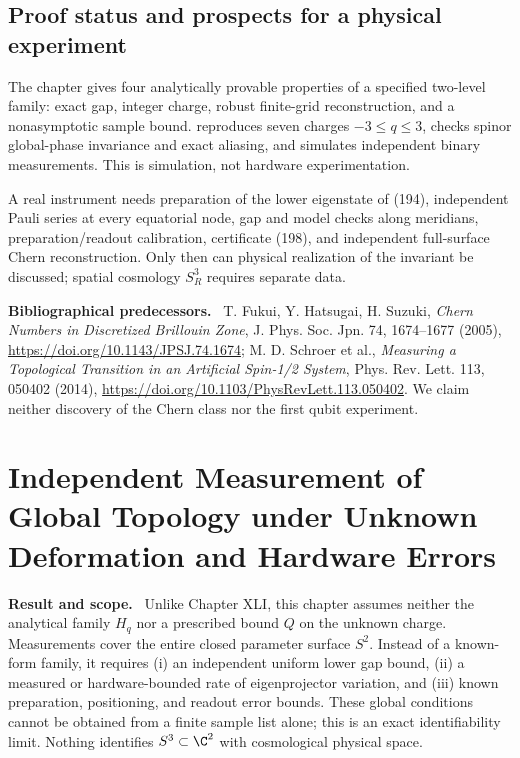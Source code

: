 \documentclass[11pt,a4paper,oneside]{book}
\newcommand{\note}[1]{\par\medskip\noindent\textbf{#1}\ }
\begin{document}
\section{Proof status and prospects for a physical experiment}
The chapter gives four analytically provable properties of a specified two-level family: exact gap, integer charge, robust finite-grid reconstruction, and a nonasymptotic sample bound.  reproduces seven charges $-3\le q\le3$, checks spinor global-phase invariance and exact aliasing, and simulates independent binary measurements. This is simulation, not hardware experimentation.

A real instrument needs preparation of the lower eigenstate of (194), independent Pauli series at every equatorial node, gap and model checks along meridians, preparation/readout calibration, certificate (198), and independent full-surface Chern reconstruction. Only then can physical realization of the invariant be discussed; spatial cosmology $S_R^3$ requires separate data.
\note{Bibliographical predecessors.} T. Fukui, Y. Hatsugai, H. Suzuki, \emph{Chern Numbers in Discretized Brillouin Zone}, J. Phys. Soc. Jpn. 74, 1674--1677 (2005), \url{https://doi.org/10.1143/JPSJ.74.1674}; M. D. Schroer et al., \emph{Measuring a Topological Transition in an Artificial Spin-1/2 System}, Phys. Rev. Lett. 113, 050402 (2014), \url{https://doi.org/10.1103/PhysRevLett.113.050402}. We claim neither discovery of the Chern class nor the first qubit experiment.
\setcounter{equation}{199}


\chapter{Independent Measurement of Global Topology under Unknown Deformation and Hardware Errors}
\note{Result and scope.} Unlike Chapter XLI, this chapter assumes neither the analytical family $H_q$ nor a prescribed bound $Q$ on the unknown charge. Measurements cover the entire closed parameter surface $S^2$. Instead of a known-form family, it requires (i) an independent uniform lower gap bound, (ii) a measured or hardware-bounded rate of eigenprojector variation, and (iii) known preparation, positioning, and readout error bounds. These global conditions cannot be obtained from a finite sample list alone; this is an exact identifiability limit. Nothing identifies $S^3\subset\C^2$ with cosmological physical space.
\end{document}
